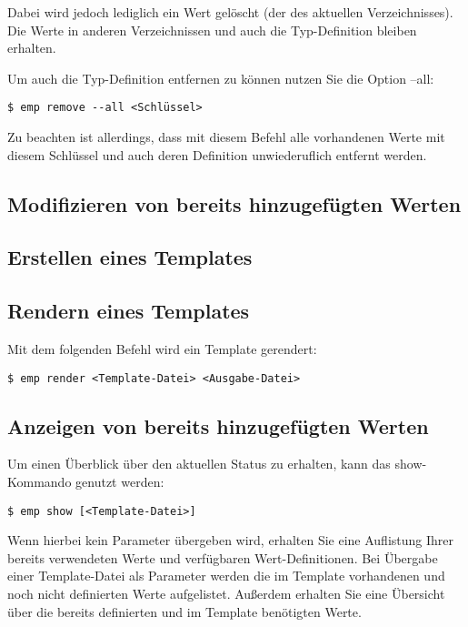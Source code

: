Dabei wird jedoch lediglich ein Wert gelöscht (der des aktuellen Verzeichnisses). Die Werte in anderen Verzeichnissen und auch die Typ-Definition bleiben erhalten.

Um auch die Typ-Definition entfernen zu können nutzen Sie die Option --all:
\begin{lstlisting}[style=Bash]
$ emp remove --all <Schlüssel>
\end{lstlisting}
Zu beachten ist allerdings, dass mit diesem Befehl alle vorhandenen Werte mit diesem Schlüssel und auch deren Definition unwiederuflich entfernt werden.

\subsection{Modifizieren von bereits hinzugefügten Werten}
\subsection{Erstellen eines Templates}
\subsection{Rendern eines Templates}
Mit dem folgenden Befehl wird ein Template gerendert:
\begin{lstlisting}[style=Bash]
$ emp render <Template-Datei> <Ausgabe-Datei>
\end{lstlisting}

\subsection{Anzeigen von bereits hinzugefügten Werten}
Um einen Überblick über den aktuellen Status zu erhalten, kann das show-Kommando genutzt werden:
\begin{lstlisting}[style=Bash]
$ emp show [<Template-Datei>]
\end{lstlisting}
Wenn hierbei kein Parameter übergeben wird, erhalten Sie eine Auflistung Ihrer bereits verwendeten Werte und verfügbaren Wert-Definitionen.
Bei Übergabe einer Template-Datei als Parameter werden die im Template vorhandenen und noch nicht definierten Werte aufgelistet. Außerdem erhalten Sie eine Übersicht über die bereits definierten und im Template benötigten Werte.
